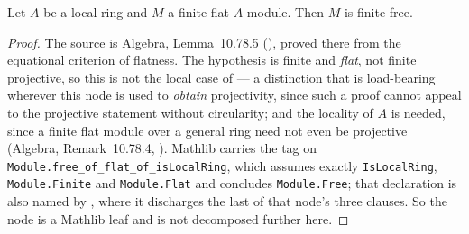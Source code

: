 \begin{lemma}
\label{lem:pc-finite-flat-local-free}
Let $A$ be a local ring and $M$ a finite flat $A$-module.  Then $M$ is
finite free.
\mathlibok\ 
\end{lemma}
\begin{proof}
The source is Algebra, Lemma~10.78.5 (), proved
there from the equational criterion of flatness.  The hypothesis is
finite and \emph{flat}, not finite projective, so this is not the local
case of  --- a distinction that is
load-bearing wherever this node is used to \emph{obtain} projectivity,
since such a proof cannot appeal to the projective statement without
circularity; and the locality of $A$
is needed, since a finite flat module over a general ring need not even
be projective (Algebra, Remark~10.78.4, ).  Mathlib
carries the tag on \texttt{Module.free\_of\_flat\_of\_isLocalRing},
which assumes exactly \texttt{IsLocalRing}, \texttt{Module.Finite} and
\texttt{Module.Flat} and concludes \texttt{Module.Free}; that
declaration is also named by
, where it discharges the last of
that node's three clauses.  So the node is a Mathlib leaf and is not
decomposed further here.
\end{proof}

